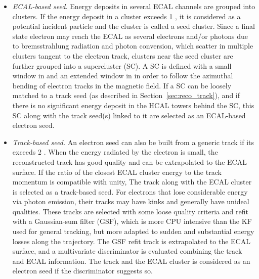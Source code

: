 \begin{itemize}
    \item \textit{ECAL-based seed.}
          Energy deposits in several ECAL channels are grouped into clusters. 
          If the energy deposit in a cluster exceeds 1 \GeV, 
          it is considered as a potential incident particle and the cluster is called a seed cluster.
          Since a final state electron may reach the ECAL as several electrons and/or photons 
          due to bremsstrahlung radiation and photon conversion, which scatter in multiple clusters tangent to the electron track,
          clusters near the seed cluster are further grouped into a supercluster (SC).
          A SC is defined with a small window in \eta{} and an extended window in \phi{} 
          in order to follow the azimuthal bending of electron tracks in the magnetic field.
          If a SC can be loosely matched to a track seed (as described in Section~\ref{sec:reco_track}),
          and if there is no significant energy deposit in the HCAL towers behind the SC,
          this SC along with the track seed(s) linked to it are selected as an ECAL-based electron seed.

    \item \textit{Track-based seed.}
          An electron seed can also be built from a generic track if its \pt exceeds 2 \GeV.
          When the energy radiated by the electron is small, the reconstructed track has good quality 
          and can be extrapolated to the ECAL surface.
          If the ratio of the closest ECAL cluster energy to the track momentum is compatible with unity,
          The track along with the ECAL cluster is selected as a track-based seed.
          For electrons that lose considerable energy via photon emission, 
          their tracks may have kinks and generally have unideal qualities.
          These tracks are selected with some loose quality criteria and refit with a Gaussian-sum filter (GSF),
          which is more CPU intensive than the KF used for general tracking,
          but more adapted to sudden and substantial energy losses along the trajectory.
          The GSF refit track is extrapolated to the ECAL surface, 
          and a multivariate discriminator is evaluated combining the track and ECAL information.
          The track and the ECAL cluster is considered as an electron seed if the discriminator suggests so. 

\end{itemize}

